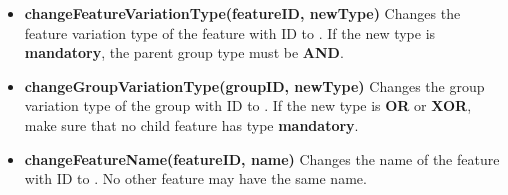 \begin{itemize}
  \item \textbf{changeFeatureVariationType(featureID, newType)} 
    Changes the feature variation type of the feature with ID  to . If the new type is \textbf{mandatory}, the parent group type must be \textbf{AND}. 
  \item \textbf{changeGroupVariationType(groupID, newType)}
    Changes the group variation type of the group with ID  to . If the new type is \textbf{OR} or \textbf{XOR}, make sure that no child feature has type \textbf{mandatory}. 
  \item \textbf{changeFeatureName(featureID, name)}
    Changes the name of the feature with ID  to . No other feature may have the same name.
\end{itemize}
